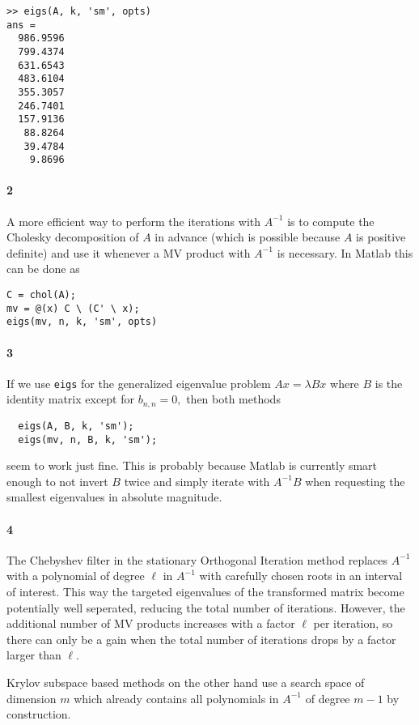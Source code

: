 \documentclass[a4paper]{article}
\begin{document}
  \begin{lstlisting}
>> eigs(A, k, 'sm', opts)
ans =
  986.9596
  799.4374
  631.6543
  483.6104
  355.3057
  246.7401
  157.9136
   88.8264
   39.4784
    9.8696
  \end{lstlisting}

  \paragraph{2} A more efficient way to perform the iterations with $A^{-1}$ is to compute the Cholesky decomposition of $A$ in advance (which is possible because $A$ is positive definite) and use it whenever a MV product with $A^{-1}$ is necessary. In Matlab this can be done as
  \begin{lstlisting}
C = chol(A);
mv = @(x) C \ (C' \ x);
eigs(mv, n, k, 'sm', opts)
  \end{lstlisting}

  \paragraph{3} If we use {\tt eigs} for the generalized eigenvalue problem $Ax = \lambda Bx$ where $B$ is the identity matrix except for $b_{n,n} = 0,$ then both methods
\begin{lstlisting}
  eigs(A, B, k, 'sm');
  eigs(mv, n, B, k, 'sm');
\end{lstlisting}
   seem to work just fine. This is probably because Matlab is currently smart enough to not invert $B$ twice and simply iterate with $A^{-1}B$ when requesting the smallest eigenvalues in absolute magnitude.

   \paragraph{4} The Chebyshev filter in the stationary Orthogonal Iteration method replaces $A^{-1}$ with a polynomial of degree $\ell$ in $A^{-1}$ with carefully chosen roots in an interval of interest. This way the targeted eigenvalues of the transformed matrix become potentially well seperated, reducing the total number of iterations. However, the additional number of MV products increases with a factor $\ell$ per iteration, so there can only be a gain when the total number of iterations drops by a factor larger than $\ell.$

   Krylov subspace based methods on the other hand use a search space of dimension $m$ which already contains all polynomials in $A^{-1}$ of degree $m - 1$ by construction.
\end{document}
